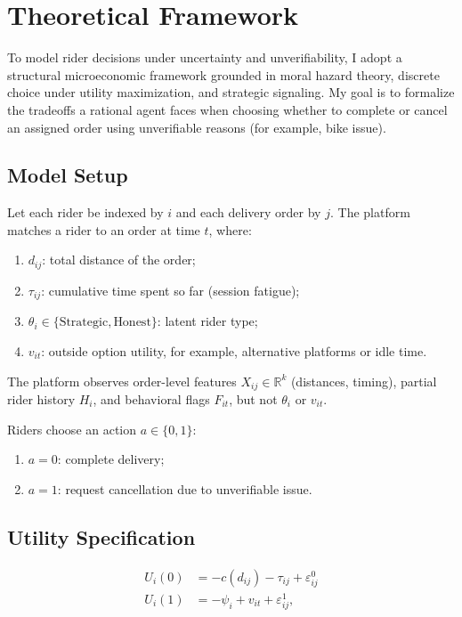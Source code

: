 \section{Theoretical Framework}

To model rider decisions under uncertainty and unverifiability, I adopt a structural microeconomic framework grounded in moral hazard theory, discrete choice under utility maximization, and strategic signaling. My goal is to formalize the tradeoffs a rational agent faces when choosing whether to complete or cancel an assigned order using unverifiable reasons (for example, bike issue).

\subsection{Model Setup}

Let each rider be indexed by $i$ and each delivery order by $j$. The platform matches a rider to an order at time $t$, where:
\begin{enumerate}
    \item $d_{ij}$: total distance of the order;
    \item $\tau_{ij}$: cumulative time spent so far (session fatigue);
    \item $\theta_i \in \{\text{Strategic}, \text{Honest}\}$: latent rider type;
    \item $v_{it}$: outside option utility, for example, alternative platforms or idle time.
\end{enumerate}

The platform observes order-level features $X_{ij} \in \mathbb{R}^k$ (distances, timing), partial rider history $H_i$, and behavioral flags $F_{it}$, but not $\theta_i$ or $v_{it}$.

Riders choose an action $a \in \{0, 1\}$:
\begin{enumerate}
    \item $a = 0$: complete delivery;
    \item $a = 1$: request cancellation due to unverifiable issue.
\end{enumerate}

\subsection{Utility Specification}

\begin{align}
U_i(0) &= -c(d_{ij}) - \tau_{ij} + \varepsilon^0_{ij} \tag{1}\\
U_i(1) &= -\psi_i + v_{it} + \varepsilon^1_{ij}, \tag{2}
\end{align}

